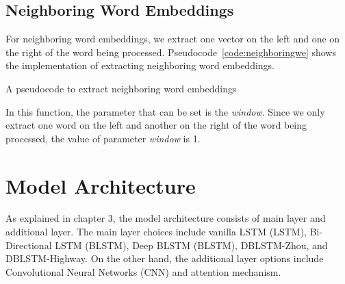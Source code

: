 \subsection{Neighboring Word Embeddings}
For neighboring word embeddings, we extract one vector on the left and one on the right of the word being processed. Pseudocode~\ref{code:neighboringwe} shows the implementation of extracting neighboring word embeddings.

\begin{kode}	
	
	\SetAlgoLined
	\caption{A pseudocode to extract neighboring word embeddings}
	\label{code:neighboringwe}	
\end{kode}

In this function, the parameter that can be set is the \textit{window}. Since we only extract one word on the left and another on the right of the word being processed, the value of parameter \textit{window} is 1.

\section{Model Architecture}
As explained in chapter 3, the model architecture consists of main layer and additional layer. The main layer choices include vanilla LSTM (LSTM), Bi-Directional LSTM (BLSTM), Deep BLSTM (BLSTM), DBLSTM-Zhou, and DBLSTM-Highway. On the other hand, the additional layer options include Convolutional Neural Networks (CNN) and attention mechanism. 


